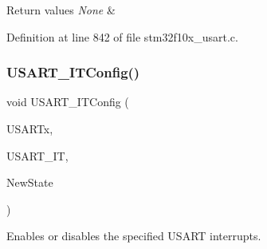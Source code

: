 \begin{DoxyRetVals}{Return values}
{\em None} & \\
\hline
\end{DoxyRetVals}


Definition at line 842 of file stm32f10x\+\_\+usart.\+c.

\mbox{\label{group___u_s_a_r_t___private___functions_ga6d8f2dd1f34060ae7e386e3e5d56b6f6}} 
\subsubsection{\texorpdfstring{U\+S\+A\+R\+T\+\_\+\+I\+T\+Config()}{USART\_ITConfig()}}
{\footnotesize\ttfamily void U\+S\+A\+R\+T\+\_\+\+I\+T\+Config (\begin{DoxyParamCaption}\item[{\hyperlink{struct_u_s_a_r_t___type_def}{U\+S\+A\+R\+T\+\_\+\+Type\+Def} $\ast$}]{U\+S\+A\+R\+Tx,  }\item[{uint16\+\_\+t}]{U\+S\+A\+R\+T\+\_\+\+IT,  }\item[{\hyperlink{group___exported__types_gac9a7e9a35d2513ec15c3b537aaa4fba1}{Functional\+State}}]{New\+State }\end{DoxyParamCaption})}



Enables or disables the specified U\+S\+A\+RT interrupts. 


